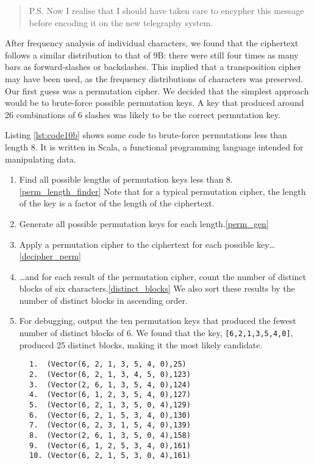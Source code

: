 \begin{quote}\ttfamily
    P.S. Now I realise that I should have taken care to encypher this message before 
    encoding it on the new telegraphy system.
\end{quote}

After frequency analysis of individual characters, we found that the ciphertext follows a similar distribution to that of 9B: there were still four times as many bars as forward-slashes or backslashes. This implied that a transposition cipher may have been used, as the frequency distributions of characters was preserved. Our first guess was a permutation cipher. We decided that the simplest approach would be to brute-force possible permutation keys. A key that produced around 26 combinations of 6 slashes was likely to be the correct permutation key.

Listing \ref{lst:code10b} shows some code to brute-force permutations less than length 8. It is written in Scala, a functional programming language intended for manipulating data. 

\begin{enumerate}
    \item Find all possible lengths of permutation keys less than 8.\cref{perm_length_finder} Note that for a typical permutation cipher, the length of the key is a factor of the length of the ciphertext.
    \item Generate all possible permutation keys for each length.\cref{perm_gen}
    \item Apply a permutation cipher to the ciphertext for each possible key\ldots\cref{decipher_perm}
    \item \ldots and for each result of the permutation cipher, count the number of distinct blocks of six characters.\cref{distinct_blocks} We also sort these results by the number of distinct blocks in ascending order.
    \item For debugging, output the ten permutation keys that produced the fewest number of distinct blocks of 6. We found that the key, \texttt{[6,2,1,3,5,4,0]}, produced 25 distinct blocks, making it the most likely candidate.
\end{enumerate}

\begin{figure}[H]
\centering
\begin{minipage}{37ex}
    \begin{verbatim}
1.  (Vector(6, 2, 1, 3, 5, 4, 0),25) 
2.  (Vector(6, 2, 1, 3, 4, 5, 0),123)
3.  (Vector(2, 6, 1, 3, 5, 4, 0),124)
4.  (Vector(6, 1, 2, 3, 5, 4, 0),127)
5.  (Vector(6, 2, 1, 3, 5, 0, 4),129)
6.  (Vector(6, 2, 1, 5, 3, 4, 0),130)
7.  (Vector(6, 2, 3, 1, 5, 4, 0),139)
8.  (Vector(2, 6, 1, 3, 5, 0, 4),158)
9.  (Vector(6, 1, 2, 5, 3, 4, 0),161)
10. (Vector(6, 2, 1, 5, 3, 0, 4),161)
    \end{verbatim}
\end{minipage}
\end{figure}

